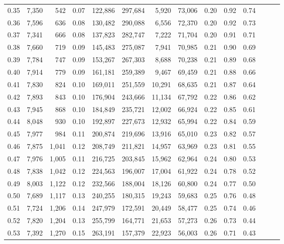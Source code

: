 \begin{tabular}{rrrrrrrrrrrrrr}
0.35 &  7,350 &    542 &  0.07 &  122,886 &  297,684 &   5,920 &  73,006 &  0.20 &  0.92 &      0.74 \\
0.36 &  7,596 &    636 &  0.08 &  130,482 &  290,088 &   6,556 &  72,370 &  0.20 &  0.92 &      0.73 \\
0.37 &  7,341 &    666 &  0.08 &  137,823 &  282,747 &   7,222 &  71,704 &  0.20 &  0.91 &      0.71 \\
0.38 &  7,660 &    719 &  0.09 &  145,483 &  275,087 &   7,941 &  70,985 &  0.21 &  0.90 &      0.69 \\
0.39 &  7,784 &    747 &  0.09 &  153,267 &  267,303 &   8,688 &  70,238 &  0.21 &  0.89 &      0.68 \\
0.40 &  7,914 &    779 &  0.09 &  161,181 &  259,389 &   9,467 &  69,459 &  0.21 &  0.88 &      0.66 \\
0.41 &  7,830 &    824 &  0.10 &  169,011 &  251,559 &  10,291 &  68,635 &  0.21 &  0.87 &      0.64 \\
0.42 &  7,893 &    843 &  0.10 &  176,904 &  243,666 &  11,134 &  67,792 &  0.22 &  0.86 &      0.62 \\
0.43 &  7,945 &    868 &  0.10 &  184,849 &  235,721 &  12,002 &  66,924 &  0.22 &  0.85 &      0.61 \\
0.44 &  8,048 &    930 &  0.10 &  192,897 &  227,673 &  12,932 &  65,994 &  0.22 &  0.84 &      0.59 \\
0.45 &  7,977 &    984 &  0.11 &  200,874 &  219,696 &  13,916 &  65,010 &  0.23 &  0.82 &      0.57 \\
0.46 &  7,875 &  1,041 &  0.12 &  208,749 &  211,821 &  14,957 &  63,969 &  0.23 &  0.81 &      0.55 \\
0.47 &  7,976 &  1,005 &  0.11 &  216,725 &  203,845 &  15,962 &  62,964 &  0.24 &  0.80 &      0.53 \\
0.48 &  7,838 &  1,042 &  0.12 &  224,563 &  196,007 &  17,004 &  61,922 &  0.24 &  0.78 &      0.52 \\
0.49 &  8,003 &  1,122 &  0.12 &  232,566 &  188,004 &  18,126 &  60,800 &  0.24 &  0.77 &      0.50 \\
0.50 &  7,689 &  1,117 &  0.13 &  240,255 &  180,315 &  19,243 &  59,683 &  0.25 &  0.76 &      0.48 \\
0.51 &  7,724 &  1,206 &  0.14 &  247,979 &  172,591 &  20,449 &  58,477 &  0.25 &  0.74 &      0.46 \\
0.52 &  7,820 &  1,204 &  0.13 &  255,799 &  164,771 &  21,653 &  57,273 &  0.26 &  0.73 &      0.44 \\
0.53 &  7,392 &  1,270 &  0.15 &  263,191 &  157,379 &  22,923 &  56,003 &  0.26 &  0.71 &      0.43 \\

\end{tabular}
